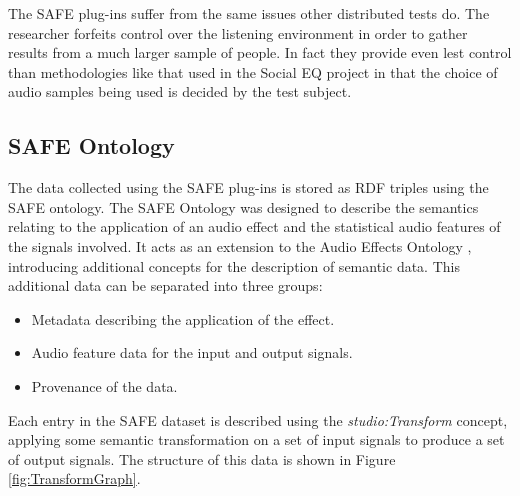 		The SAFE plug-ins suffer from the same issues other distributed tests do. The researcher forfeits control
		over the listening environment in order to gather results from a much larger sample of people. In fact they
		provide even lest control than methodologies like that used in the Social EQ project
		\citep{cartwright2013socialeq} in that the choice of audio samples being used is decided by the test
		subject. 

	\subsection{SAFE Ontology}
	\label{sec:TimbreEvaluation-DAWBasedTimbreEvaluation-SAFEOntology}

		The data collected using the SAFE plug-ins is stored as RDF triples using the SAFE ontology.  The SAFE
		Ontology was designed to describe the semantics relating to the application of an audio effect and the
		statistical audio features of the signals involved. It acts as an extension to the Audio Effects Ontology
		\citep{wilmering2013the}, introducing additional concepts for the description of semantic data.  This
		additional data can be separated into three groups:

		\begin{itemize}
			\item Metadata describing the application of the effect.
			\item Audio feature data for the input and output signals.
			\item Provenance of the data.
		\end{itemize}

		Each entry in the SAFE dataset is described using the \emph{studio:Transform} concept, applying
		some semantic transformation on a set of input signals to produce a set of output signals. The structure of
		this data is shown in Figure \ref{fig:TransformGraph}.


